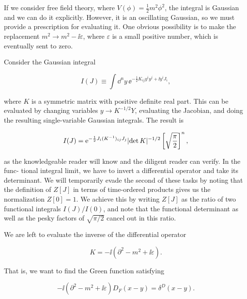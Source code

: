 If we consider free field theory, where $V(\phi)=\frac12m^2\phi^2$, the integral is Gaussian and
we can do it explicitly. However, it is an oscillating Gaussian, so we must provide
a prescription for evaluating it. One obvious possibility is to make the replacement
$m^2\to m^2-\ii\varepsilon$, where $\varepsilon$ is a small positive number, which is eventually sent
to zero.

Consider the Gaussian integral

\begin{equation}
I(J)\equiv\int\dd^ny\,\ee^{-\frac12K_{ij}y^iy^j+\ii y^iJ_i},
\label{eq:3.15}
\end{equation}

where $K$ is a symmetric matrix with positive definite real part. This can be evaluated
by changing variables $y\to K^{-1/2}Y$, evaluating the Jacobian, and doing the resulting
single-variable Gaussian integrals. The result is

\begin{equation}
I(J)=\mathrm{e}^{-\frac12J_i(K^{-1})_{ij}J_j}\lvert\det K\rvert^{-1/2}\left[\sqrt{\frac{\pi}{2}}\right]^n,
\label{eq:3.16}
\end{equation}

as the knowledgeable reader will know and the diligent reader can verify. In the func-
tional integral limit, we have to invert a differential operator and take its determinant.
We will temporarily evade the second of these tasks by noting that the definition of $Z[J]$
in terms of time-ordered products gives us the normalization $Z[0]=1$. We achieve this
by writing $Z[J]$ as the ratio of two functional integrals $I(J)/I(0)$, and note that the
functional determinant as well as the pesky factors of $\sqrt{\pi/2}$ cancel out in this ratio.

We are left to evaluate the inverse of the differential operator

\begin{equation}
K=-\ii(\partial^2-m^2+\ii\varepsilon).
\label{eq:3.17}
\end{equation}

That is, we want to find the Green function satisfying

\begin{equation}
-\ii(\partial^2-m^2+\ii\varepsilon)D_F(x-y)=\delta^D(x-y).
\label{eq:3.18}
\end{equation}

